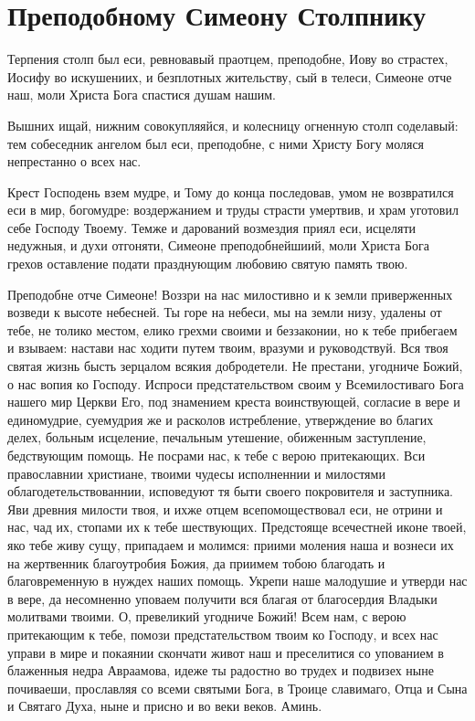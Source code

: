  

\section{Преподобному Симеону Столпнику}
 




Терпения столп был еси, ревновавый праотцем, преподобне, Иову во страстех, Иосифу во искушениих, и безплотных жительству, сый в телеси, Симеоне отче наш, моли Христа Бога спастися душам нашим. 




Вышних ищай, нижним совокупляяйся, и колесницу огненную столп соделавый: тем собеседник ангелом был еси, преподобне, с ними Христу Богу моляся непрестанно о всех нас.




Крест Господень взем мудре, и Тому до конца последовав, умом не возвратился еси в мир, богомудре: воздержанием и труды страсти умертвив, и храм уготовил себе Господу Твоему. Темже и дарований возмездия приял еси, исцеляти недужныя, и духи отгоняти, Симеоне преподобнейшиий, моли Христа Бога грехов оставление подати празднующим любовию святую память твою.




Преподобне отче Симеоне! Воззри на нас милостивно и к земли приверженных возведи к высоте небесней. Ты горе на небеси, мы на земли низу, удалены от тебе, не толико местом, елико грехми своими и беззаконии, но к тебе прибегаем и взываем: настави нас ходити путем твоим, вразуми и руководствуй. Вся твоя святая жизнь бысть зерцалом всякия добродетели. Не престани, угодниче Божий, о нас вопия ко Господу. Испроси предстательством своим у Всемилостиваго Бога нашего мир Церкви Его, под знамением креста воинствующей, согласие в вере и единомудрие, суемудрия же и расколов истребление, утверждение во благих делех, больным исцеление, печальным утешение, обиженным заступление, бедствующим помощь. Не посрами нас, к тебе с верою притекающих. Вси православнии христиане, твоими чудесы исполненнии и милостями облагодетельствованнии, исповедуют тя быти своего покровителя и заступника. Яви древния милости твоя, и ихже отцем всепомоществовал еси, не отрини и нас, чад их, стопами их к тебе шествующих. Предстояще всечестней иконе твоей, яко тебе живу сущу, припадаем и молимся: приими моления наша и вознеси их на жертвенник благоутробия Божия, да приимем тобою благодать и благовременную в нуждех наших помощь. Укрепи наше малодушие и утверди нас в вере, да несомненно уповаем получити вся благая от благосердия Владыки молитвами твоими. О, превеликий угодниче Божий! Всем нам, с верою притекающим к тебе, помози предстательством твоим ко Господу, и всех нас управи в мире и покаянии скончати живот наш и преселитися со упованием в блаженныя недра Авраамова, идеже ты радостно во трудех и подвизех ныне почиваеши, прославляя со всеми святыми Бога, в Троице славимаго, Отца и Сына и Святаго Духа, ныне и присно и во веки веков. Аминь.
\mychapterending

